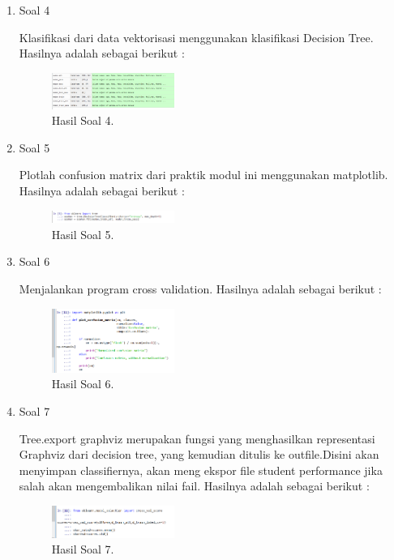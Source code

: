 \begin{enumerate}
	\item Soal 4
	\hfill\break
	
	Klasifikasi dari data vektorisasi menggunakan klasifikasi Decision Tree. Hasilnya adalah sebagai berikut :
	\begin{figure}[H]
	\centering
		\includegraphics[width=4cm]{figures/1174021/tugas2/materi/hasil4.PNG}
		\caption{Hasil Soal 4.}
	\end{figure}

	\item Soal 5
	\hfill\break
	
	Plotlah confusion matrix dari praktik modul ini menggunakan matplotlib. Hasilnya adalah sebagai berikut :
	\begin{figure}[H]
	\centering
		\includegraphics[width=4cm]{figures/1174021/tugas2/materi/hasil5.PNG}
		\caption{Hasil Soal 5.}
	\end{figure}

	\item Soal 6
	\hfill\break
	
	Menjalankan program cross validation. Hasilnya adalah sebagai berikut :
	\begin{figure}[H]
	\centering
		\includegraphics[width=4cm]{figures/1174021/tugas4/materi/hasil6.PNG}
		\caption{Hasil Soal 6.}
	\end{figure}

	\item Soal 7
	\hfill\break
	
	Tree.export graphviz merupakan fungsi yang menghasilkan representasi Graphviz dari decision tree, yang kemudian ditulis ke outfile.Disini akan menyimpan classifiernya, akan meng ekspor file student performance jika salah akan mengembalikan nilai fail. Hasilnya adalah sebagai berikut :
	\begin{figure}[H]
	\centering
		\includegraphics[width=4cm]{figures/1174021/tugas4/materi/hasil7.PNG}
		\caption{Hasil Soal 7.}
	\end{figure}


\end{enumerate}
